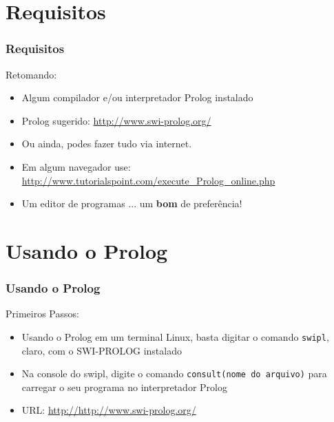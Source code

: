 \documentclass[sans]{beamer}
\begin{document}

\section{Requisitos} 

\begin{frame}[fragile]   %
\frametitle{Requisitos}
\begin{block}{Retomando:}
\begin{itemize}
\itemsep 0.5cm

\item Algum compilador e/ou interpretador Prolog instalado

\item Prolog sugerido: \url{http://www.swi-prolog.org/}

\item  Ou ainda, podes fazer tudo via internet.

\item Em algum navegador use: \url{http://www.tutorialspoint.com/execute_Prolog_online.php}

\item Um editor de programas ... um \textbf{bom} de preferência!

\end{itemize} 
\end{block}  
\end{frame}


\section{Usando o Prolog} 

\begin{frame}[fragile]   %
\frametitle{Usando o Prolog}
\begin{block}{Primeiros Passos:}
\begin{itemize}

\itemsep 17pt

\item Usando o Prolog em um  terminal Linux,  basta  digitar o comando \texttt{swipl}, claro, com o SWI-PROLOG instalado

\item Na console do swipl, digite o comando \texttt{consult(nome do arquivo)} para carregar o seu  programa no interpretador Prolog



\item URL: \url{http://http://www.swi-prolog.org/}

\end{itemize} 
\end{block}  
\end{frame}
\end{document}

